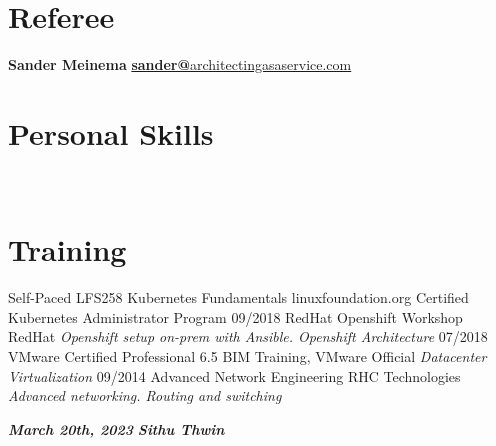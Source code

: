 \documentclass[]{friggeri-cv}
\begin{document}
\begin{aside}
~
~
~
~
  \section{Referee}
    \textbf{Sander Meinema}
    \href{mailto:sander@architectingasaservice.com}{\textbf{sander@}architectingasaservice.com}
  ~
  \section{Personal Skills}
~
\end{aside}
\section{Training}
\begin{entrylist}
  \entry
  {Self-Paced}
  {LFS258 Kubernetes Fundamentals}
  {linuxfoundation.org}
  {Certified Kubernetes Administrator Program}
  \entry
  {09/2018}
  {RedHat Openshift Workshop}
  {RedHat}
  {\emph{Openshift setup on-prem with Ansible. Openshift Architecture}}	\entry
  {07/2018}
  {VMware Certified Professional 6.5}
  {BIM Training, VMware Official}
  {\emph{Datacenter Virtualization}}
  \entry
  {09/2014}
  {Advanced Network Engineering}
  {RHC Technologies}
  {\emph{Advanced networking. Routing and switching}}
\end{entrylist}

\textbf{\emph{March 20th, 2023}}
\hfill
\textbf{\emph{Sithu Thwin}}
\end{document}
